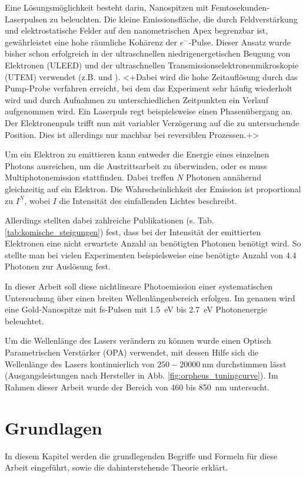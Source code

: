 \documentclass[bachelor,       %
               twoside,        %
               BCOR10mm,       %
               english,ngerman, %
               ]{GAUBM}
\begin{document}
Eine Lösungsmöglichkeit besteht darin, Nanospitzen mit Femtosekunden-Laserpulsen zu beleuchten.
Die kleine Emissionsfläche, die durch Feldverstärkung und elektrostatische Felder auf den nanometrischen Apex begrenzbar ist, gewährleistet eine hohe räumliche Kohärenz der $e^-$-Pulse.
Dieser Ansatz wurde bisher schon erfolgreich in der ultraschnellen niedrigenergetischen Beugung von Elektronen (ULEED) und der ultraschnellen Transmissionselektronenmikroskopie (UTEM) verwendet (z.B. \citet{gulde_ultrafast_2014} und \citet{barwick_4d_2008}).
<+Dabei wird die hohe Zeitauflösung durch das Pump-Probe verfahren erreicht, bei dem das Experiment sehr häufig wiederholt wird und durch Aufnahmen zu unterschiedlichen Zeitpunkten ein Verlauf aufgenommen wird.
Ein Laserpuls regt beispielsweise einen Phasenübergang an.
Der Elektronenpuls trifft nun mit variabler Verzögerung auf die zu untersuchende Position.
Dies ist allerdings nur machbar bei reversiblen Prozessen.+>

Um ein Elektron zu emittieren kann entweder die Energie eines einzelnen Photons ausreichen, um die Austrittsarbeit zu überwinden, oder es muss Multiphotonemission stattfinden.
Dabei treffen $N$ Photonen annähernd gleichzeitig auf ein Elektron.
Die Wahrscheinlichkeit der Emission ist proportional zu $I^N$, wobei $I$ die Intensität des einfallenden Lichtes beschreibt.

Allerdings stellten dabei zahlreiche Publikationen (s. Tab. \ref{tab:komische_steigungen}) fest, dass bei der Intensität der emittierten Elektronen eine nicht erwartete Anzahl an benötigten Photonen benötigt wird.
So stellte man bei vielen Experimenten beispielsweise eine benötigte Anzahl von $4.4$ Photonen zur Auslösung fest.

In dieser Arbeit soll diese nichtlineare Photoemission einer systematischen Untersuchung über einen breiten Wellenlängenbereich erfolgen. Im genauen wird eine Gold-Nanospitze mit fs-Pulsen mit \SI{1.5}{\eV} bis \SI{2.7}{\eV} Photonenergie beleuchtet.

Um die Wellenlänge des Lasers verändern zu können wurde einen Optisch Parametrischen Verstärker (OPA) verwendet, mit dessen Hilfe sich die Wellenlänge des Lasers kontinuierlich von $250-\SI{20000}{\nano\meter}$ durchstimmen lässt (Ausgangsleistungen nach Hersteller in Abb. \ref{fig:orpheus_tuningcurve}).
Im Rahmen dieser Arbeit wurde der Bereich von 460 bis \SI{850}{\nm} untersucht.



\chapter{Grundlagen}
In diesem Kapitel werden die grundlegenden Begriffe und Formeln für diese Arbeit eingeführt, sowie die dahinterstehende Theorie erklärt.
\end{document}
